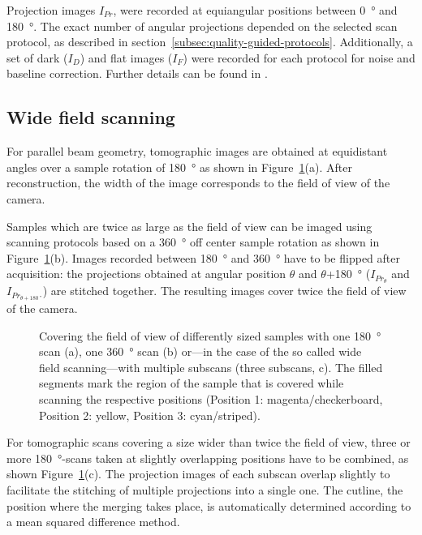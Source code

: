 Projection images $I_{Pr}$, were recorded at equiangular positions between \SI{0}{\degree} and \SI{180}{\degree}. The exact number of angular projections depended on the selected scan protocol, as described in section~\ref{subsec:quality-guided-protocols}. Additionally, a set of dark ($I_{D}$) and flat images ($I_{F}$) were recorded for each protocol \cbstart for noise and baseline correction. \cbend\cbdelete Further details can be found in 
\ifhtml
	\citet{Hintermueller2009}
\else
\fi%
.

\subsection{Wide field scanning}
For parallel beam geometry, tomographic images are obtained at equidistant angles over a sample rotation of \SI{180}{\degree} as shown in Figure~\ref{fig:scanning-possibilities}(a). After reconstruction, the width of the image corresponds to the field of view of the camera.

Samples which are twice as large as the field of view can be imaged using scanning protocols based on a \SI{360}{\degree} off center sample rotation as shown in Figure~\ref{fig:scanning-possibilities}(b). Images recorded between \SI{180}{\degree} and \SI{360}{\degree} have to be flipped after acquisition: the projections obtained at angular position $\theta$ and $\theta$+\SI{180}{\degree} ($I_{Pr_{\theta}}$ and $I_{Pr_{\theta+\SI{180}{\degree}}}$) are stitched together. The resulting images cover twice the field of view of the camera.

\begin{figure}
	\centering
	\caption{Covering the field of view of differently sized samples with one \SI{180}{\degree} scan (a), one \SI{360}{\degree} scan (b) or---in the case of the so called wide field scanning---with multiple subscans (three subscans, c). The filled segments mark the region of the sample that is covered while scanning the respective positions (Position 1: magenta/checkerboard, Position 2: yellow, Position 3: cyan/striped).}%
	\ifiucr		
	\else
	\fi
	\label{fig:scanning-possibilities}%
\end{figure}

For tomographic scans covering a size wider than twice the field of view, three or more \SI{180}{\degree}-scans taken at slightly overlapping positions have to be combined, as shown Figure~\ref{fig:scanning-possibilities}(c). The projection images of each subscan overlap slightly to \cbstart facilitate the stitching of multiple projections into a single one. The cutline, \ie the position where the merging takes place, is automatically determined according to a mean squared difference method.\cbend

